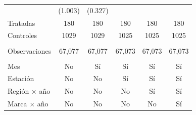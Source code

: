 \begin{tabular}{lccccc}
                        & (1.003)         & (0.327)      &              &              &   \\   
   Tratadas             & 180             & 180          & 180          & 180          & 180\\  
   Controles            & 1029            & 1029         & 1025         & 1025         & 1025\\  
    \\
   Observaciones        & 67,077          & 67,077       & 67,073       & 67,073       & 67,073\\  
    \\
   Mes                  & No              & Sí           & Sí           & Sí           & Sí\\  
   Estación             & No              & No           & Sí           & Sí           & Sí\\  
   Región $\times$ año  & No              & No           & No           & Sí           & Sí\\  
   Marca $\times$ año   & No              & No           & No           & No           & Sí\\  
   \bottomrule
\end{tabular}
\par\endgroup


